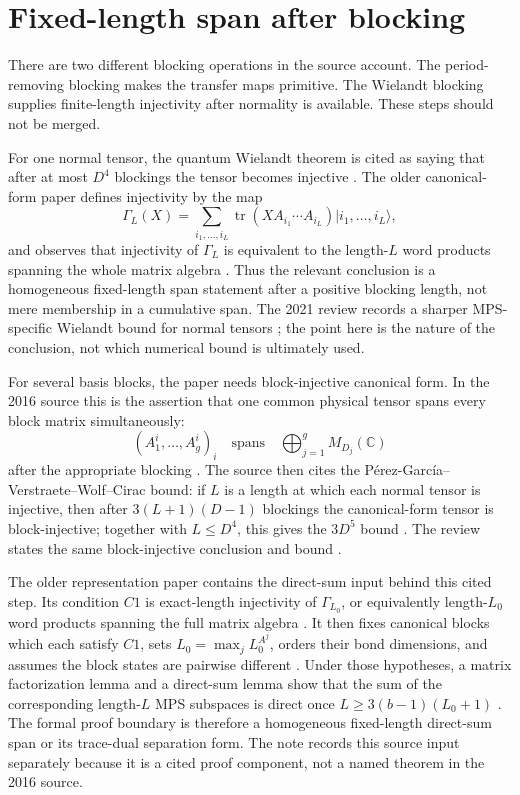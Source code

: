 \documentclass{article}
\begin{document}
\section{Fixed-length span after blocking}

There are two different blocking operations in the source account. The
period-removing blocking makes the transfer maps primitive. The Wielandt
blocking supplies finite-length injectivity after normality is available. These
steps should not be merged.

For one normal tensor, the quantum Wielandt theorem is cited as saying that
after at most $D^4$ blockings the tensor becomes injective
\cite[line~332]{Cirac2016MPDO_arXiv}. The older canonical-form paper defines
injectivity by the map
\[
  \Gamma_L(X) = \sum_{i_1,\ldots,i_L}
      \operatorname{tr}(X A_{i_1}\cdots A_{i_L})
      |i_1,\ldots,i_L\rangle,
\]
and observes that injectivity of $\Gamma_L$ is equivalent to the length-$L$
word products spanning the whole matrix algebra
\cite[lines~888--908]{PerezGarcia2007MPSReps}. Thus the relevant conclusion is
a homogeneous fixed-length span statement after a positive blocking length, not
mere membership in a cumulative span. The 2021 review records a sharper
MPS-specific Wielandt bound for normal tensors
\cite[lines~1942--1945]{Cirac2021Matrix}; the point here is the nature of the
conclusion, not which numerical bound is ultimately used.

For several basis blocks, the paper needs block-injective canonical form. In the
2016 source this is the assertion that one common physical tensor spans every
block matrix simultaneously:
\[
  (A_1^i,\ldots,A_g^i)_i
  \quad\text{spans}\quad
  \bigoplus_{j=1}^g M_{D_j}(\mathbb C)
\]
after the appropriate blocking
\cite[lines~317--332]{Cirac2016MPDO_arXiv}. The source then cites the
P\'erez-Garc\'ia--Verstraete--Wolf--Cirac bound: if $L$ is a length at which
each normal tensor is injective, then after $3(L+1)(D-1)$ blockings the
canonical-form tensor is block-injective; together with $L\le D^4$, this gives
the $3D^5$ bound
\cite[lines~340--345]{Cirac2016MPDO_arXiv}. The review states the same
block-injective conclusion and bound
\cite[lines~2114--2124]{Cirac2021Matrix}.

The older representation paper contains the direct-sum input behind this cited
step. Its condition $C1$ is exact-length injectivity of $\Gamma_{L_0}$, or
equivalently length-$L_0$ word products spanning the full matrix algebra
\cite[lines~888--908]{PerezGarcia2007MPSReps}. It then fixes canonical blocks
which each satisfy $C1$, sets $L_0=\max_j L_0^{A^j}$, orders their bond
dimensions, and assumes the block states are pairwise different
\cite[lines~1321--1330]{PerezGarcia2007MPSReps}. Under those hypotheses, a
matrix factorization lemma and a direct-sum lemma show that the sum of the
corresponding length-$L$ MPS subspaces is direct once
$L \ge 3(b-1)(L_0+1)$
\cite[lines~1333--1408]{PerezGarcia2007MPSReps}. The formal proof boundary is
therefore a homogeneous fixed-length direct-sum span or its trace-dual
separation form. The note
 records this source input
separately because it is a cited proof component, not a named theorem in the
2016 source.
\end{document}
